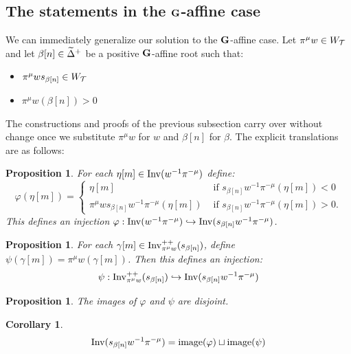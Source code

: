 \documentclass[10pt]{amsart}
\newtheorem{prop}[theo]{Proposition}
\newtheorem{coro}[theo]{Corollary}
\newcommand{\textif}{\text{ if }}\newcommand{\textand}{\text{ and }}\newcommand{\textor}{\text{ or }}\newcommand{\suchthat}{\mid}
\begin{document}
\subsection{The statements in the \texorpdfstring{$\mathbf{G}$}{G}-affine case}\label{SS:double-affine-maps}

We can immediately generalize our solution to the $\mathbf{G}$-affine case. Let $\pi^\mu w \in W_{\mathcal{T}}$ and let $\beta[n]\in\widetilde{\Delta}^+$ be a positive $\mathbf{G}$-affine root such that:
\begin{itemize}
\item $\pi^\mu w s_{\beta[n]} \in W_{\mathcal{T}}$
\item $\pi^\mu w(\beta[n]) > 0$
\end{itemize}
The constructions and proofs of the previous subsection carry over without change once we substitute $\pi^\mu w$ for $w$ and $\beta[n]$ for $\beta$. The explicit translations are as follows:

\begin{prop}
For each $\eta[m] \in \operatorname{Inv}(w^{-1} \pi^{-\mu})$ define:
\begin{equation}\label{eq:53H}
\varphi(\eta[m]) =
\begin{cases}
\eta[m] & \textif s_{\beta[n]} w^{-1} \pi^{-\mu} (\eta[m]) < 0 \\
\pi^\mu w s_{\beta[n]} w^{-1} \pi^{-\mu} (\eta[m]) & \textif s_{\beta[n]} w^{-1} \pi^{-\mu} (\eta[m]) > 0.
\end{cases}
\end{equation}
This defines an injection $\varphi : \operatorname{Inv}(w^{-1} \pi^{-\mu}) \hookrightarrow \operatorname{Inv}(s_{\beta[n]} w^{-1} \pi^{-\mu})$.
\end{prop}

\begin{prop}\label{prop-psi-is-injective-double-affine}
For each $\gamma[m] \in \operatorname{Inv}^{++}_{\pi^\mu w}(s_{\beta[n]})$, define $\psi(\gamma[m]) = \pi^\mu w (\gamma[m])$. Then this defines an injection:
\begin{equation}\label{eq:54H}
\psi : \Inv^{++}_{\pi^\mu w} (s_{\beta[n]}) \hookrightarrow \Inv(s_{\beta[n]} w^{-1} \pi^{-\mu})
\end{equation}
\end{prop}

\begin{prop}
The images of $\varphi$ and $\psi$ are disjoint.
\end{prop}

\begin{coro}
\begin{align}\label{eq:55H}
\Inv(s_{\beta[n]} w^{-1} \pi^{-\mu}) = \im(\varphi) \sqcup \im(\psi)
\end{align}
\end{coro}
\end{document}
